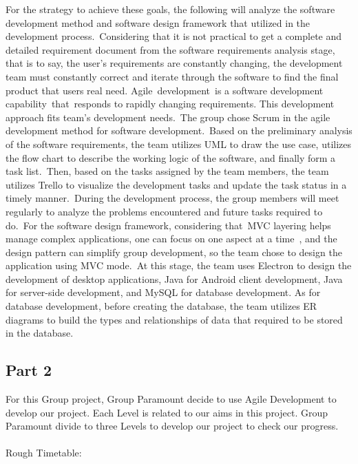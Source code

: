 \documentclass{article}
\begin{document}
	For the strategy to achieve these goals, the following will analyze the software development method and software design framework that utilized in the development process. Considering that it is not practical to get a complete and detailed requirement document from the software requirements analysis stage, that is to say, the user's requirements are constantly changing, the development team must constantly correct and iterate through the software to find the final product that users real need. Agile development is a software development capability that responds to rapidly changing requirements. This development approach fits team’s development needs. The group chose Scrum in the agile development method for software development. Based on the preliminary analysis of the software requirements, the team utilizes UML to draw the use case, utilizes the flow chart to describe the working logic of the software, and finally form a task list. Then, based on the tasks assigned by the team members, the team utilizes Trello to visualize the development tasks and update the task status in a timely manner. During the development process, the group members will meet regularly to analyze the problems encountered and future tasks required to do. For the software design framework, considering that MVC layering helps manage complex applications, one can focus on one aspect at a time , and the design pattern can simplify group development, so the team chose to design the application using MVC mode. At this stage, the team uses Electron to design the development of desktop applications, Java for Android client development, Java for server-side development, and MySQL for database development. As for database development, before creating the database, the team utilizes ER diagrams to build the types and relationships of data that required to be stored in the database.
	
	\subsection{Part 2}
	
	For this Group project, Group Paramount decide to use Agile Development to develop our project. Each Level is related to our aims in this project. Group Paramount divide to three Levels to develop our project to check our progress.
	\\ \hspace*{\fill} \\
	Rough Timetable:
	
\end{document}
